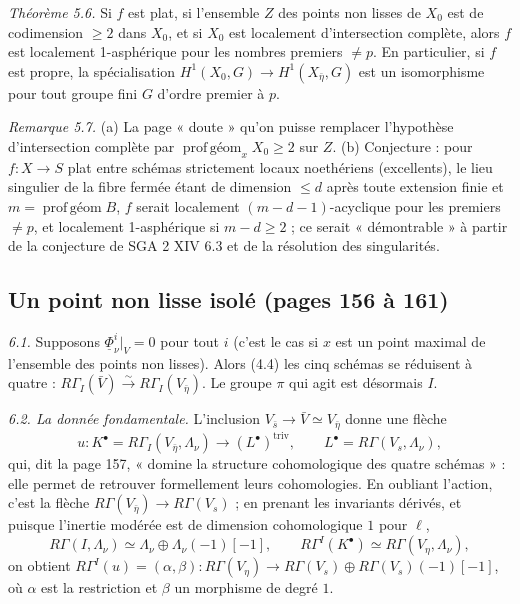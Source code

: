 \documentclass[11pt,a4paper]{article}
\begin{document}
\emph{Théorème 5.6.} Si $f$ est plat, si l'ensemble $Z$ des points non lisses de
$X_0$ est de codimension $\geq 2$ dans $X_0$, et si $X_0$ est localement
d'intersection complète, alors $f$ est localement 1-asphérique pour les nombres
premiers $\neq p$. En particulier, si $f$ est propre, la spécialisation
$H^1(X_0, G) \to H^1(X_{\bar\eta}, G)$ est un isomorphisme pour tout groupe fini
$G$ d'ordre premier à $p$.

\emph{Remarque 5.7.} (a) La page « doute » qu'on puisse remplacer l'hypothèse
d'intersection complète par $\operatorname{prof\,géom}_x X_0 \geq 2$ sur $Z$. (b)
Conjecture : pour $f : X \to S$ plat entre schémas strictement locaux noethériens
(excellents), le lieu singulier de la fibre fermée étant de dimension $\leq d$
après toute extension finie et $m = \operatorname{prof\,géom} B$, $f$ serait
localement $(m-d-1)$-acyclique pour les premiers $\neq p$, et localement
1-asphérique si $m - d \geq 2$ ; ce serait « démontrable » à partir de la
conjecture de SGA 2 XIV 6.3 et de la résolution des singularités.

\subsection*{Un point non lisse isolé (pages 156 à 161)}

\emph{6.1.} Supposons $\underline\Phi^i_\nu|_V = 0$ pour tout $i$ (c'est le cas si
$x$ est un point maximal de l'ensemble des points non lisses). Alors (4.4) les cinq
schémas se réduisent à quatre : $R\Gamma_I(\bar V) \xrightarrow{\sim}
R\Gamma_I(V_{\bar\eta})$. Le groupe $\pi$ qui agit est désormais $I$.

\emph{6.2. La donnée fondamentale.} L'inclusion $V_{\bar s} \to \bar V \simeq
V_{\bar\eta}$ donne une flèche
\[
  u : K^\bullet = R\Gamma_I(V_{\bar\eta}, \Lambda_\nu) \longrightarrow
  (L^\bullet)^{\mathrm{triv}}, \qquad L^\bullet = R\Gamma(V_s, \Lambda_\nu),
\]
qui, dit la page 157, « domine la structure cohomologique des quatre schémas » :
elle permet de retrouver formellement leurs cohomologies. En oubliant l'action,
c'est la flèche $R\Gamma(V_{\bar\eta}) \to R\Gamma(V_s)$ ; en prenant les
invariants dérivés, et puisque l'inertie modérée est de dimension
cohomologique $1$ pour $\ell$,
\[
  R\Gamma(I, \Lambda_\nu) \simeq \Lambda_\nu \oplus \Lambda_\nu(-1)[-1], \qquad
  R\Gamma^I(K^\bullet) \simeq R\Gamma(V_\eta, \Lambda_\nu),
\]
on obtient $R\Gamma^I(u) = (\alpha, \beta) : R\Gamma(V_\eta) \to R\Gamma(V_s)
\oplus R\Gamma(V_s)(-1)[-1]$, où $\alpha$ est la restriction et $\beta$ un
morphisme de degré $1$.
\end{document}
